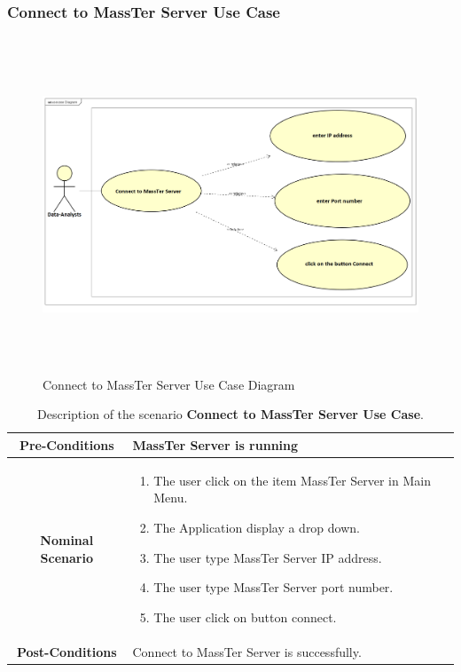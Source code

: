 	 \subsubsection{Connect to MassTer Server Use Case}
	 \begin{figure}[h]
	 	\centering
	 	\includegraphics[width=16.5cm,height=10cm]{connectToMassTerServer.png}
	 	\caption{Connect to MassTer Server Use Case Diagram}
	 	
	 \end{figure}

  \newpage
 
 \begin{table}
 	\caption{Description of the scenario \textbf{Connect to MassTer Server Use Case}.}
 	\label{DSTabCTMS}
 	\centering
 	
 	\begin{tabular}{|c|p{10cm}|}
 		\hline 	
 		\textbf{Pre-Conditions } & MassTer Server is running  \\ 
 		\hline                     
 		\textbf{Nominal Scenario } & \begin{enumerate}
 			\item The user click on the item MassTer Server in Main Menu.
 			\item The Application display a drop down. 
 			\item The user type MassTer Server IP address.
 			\item The user type MassTer Server port number.
 			\item The  user click on button connect. 
 		\end{enumerate} \\ 
 		\hline 
 		\textbf{Post-Conditions} & Connect to MassTer Server is successfully. \\
 		\hline 
 	\end{tabular}
 \end{table}
 \clearpage
 \newpage
